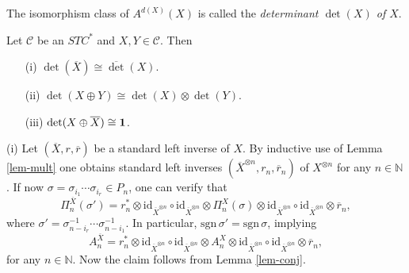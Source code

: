 \documentclass[11pt]{article}
\theoremstyle{definition}
\theoremstyle{definition}
\theoremstyle{remark}
\def\2#1{{\mathcal #1}}
\def\7#1{{\mathbb #1}}
\def\1#1{{\bf #1}}
\def\ol#1{{\overline #1}}
\newcommand{\mcirc}{\circ}
\def\id{\mathrm{id}}
\begin{document}
\bdefin {}
The isomorphism class of $A^{d(X)}(X)$ is called the {\it determinant $\det(X)$ of $X$}. 
\edefin

\blemma \label{l-dets}
Let $\2C$ be an $STC^*$ and $X,Y\in\2C$. Then 
\begin{itemize}
\item[(i)] $\det(\ol{X})\cong \ol{\det(X)}$.
\item[(ii)] $\det(X\oplus Y)\cong \det(X)\otimes \det(Y)$.
\item[(iii)] $\det(X\oplus \ol{X})\cong\11$.
\end{itemize}
\elemma

\prf (i) Let $(\ol{X},r,\ol{r})$ be a standard left inverse of $X$. By inductive use of Lemma
\ref{lem-mult} one obtains standard left inverses $(\ol{X}^{\otimes n},r_n,\ol{r}_n)$ of
$X^{\otimes n}$ for any $n\in\7N$. If now $\sigma=\sigma_{i_1}\cdots\sigma_{i_r}\in P_n$, one can
verify that
\[ \Pi_n^{\ol{X}}(\sigma')=r_n^*\otimes\id_{\ol{X}^{\otimes n}}
  \mcirc\id_{\ol{X}^{\otimes n}}\otimes\Pi_n^X(\sigma)\otimes\id_{\ol{X}^{\otimes n}}
  \mcirc\id_{\ol{X}^{\otimes n}}\otimes\ol{r}_n, \]
where $\sigma'=\sigma_{n-i_r}^{-1}\cdots\sigma_{n-i_1}^{-1}$. In particular,
$\mathrm{sgn}\,\sigma'=\mathrm{sgn}\,\sigma$, implying
\[ A_n^{\ol{X}}=r_n^*\otimes\id_{\ol{X}^{\otimes n}}
  \mcirc\id_{\ol{X}^{\otimes n}}\otimes A_n^X\otimes\id_{\ol{X}^{\otimes n}}
  \mcirc\id_{\ol{X}^{\otimes n}}\otimes\ol{r}_n, \]
for any $n\in\7N$. Now the claim follows from Lemma \ref{lem-conj}.
\end{document}
